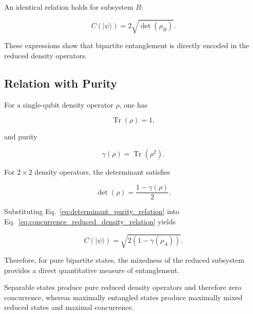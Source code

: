 \medskip

An identical relation holds for subsystem \( B \):

\begin{equation}
C(|\psi\rangle)
=
2\sqrt{\det(\rho_B)}.
\end{equation}

These expressions show that bipartite entanglement is directly encoded in the reduced density operators.


\subsection*{Relation with Purity}

For a single-qubit density operator \( \rho \), one has

\begin{equation}
\operatorname{Tr}(\rho)=1,
\label{eq:single_qubit_trace_condition}
\end{equation}

and purity

\begin{equation}
\gamma(\rho)
=
\operatorname{Tr}(\rho^2).
\label{eq:single_qubit_purity_definition}
\end{equation}

For \(2\times2\) density operators, the determinant satisfies

\begin{equation}
\det(\rho)
=
\frac{1-\gamma(\rho)}{2}.
\label{eq:determinant_purity_relation}
\end{equation}

Substituting Eq.~\eqref{eq:determinant_purity_relation} into Eq.~\eqref{eq:concurrence_reduced_density_relation} yields

\begin{equation}
C(|\psi\rangle)
=
\sqrt{
2\left(
1-\gamma(\rho_A)
\right)
}.
\label{eq:concurrence_purity_relation}
\end{equation}

Therefore, for pure bipartite states, the mixedness of the reduced subsystem provides a direct quantitative measure of entanglement.

\medskip

Separable states produce pure reduced density operators and therefore zero concurrence, whereas maximally entangled states produce maximally mixed reduced states and maximal concurrence.